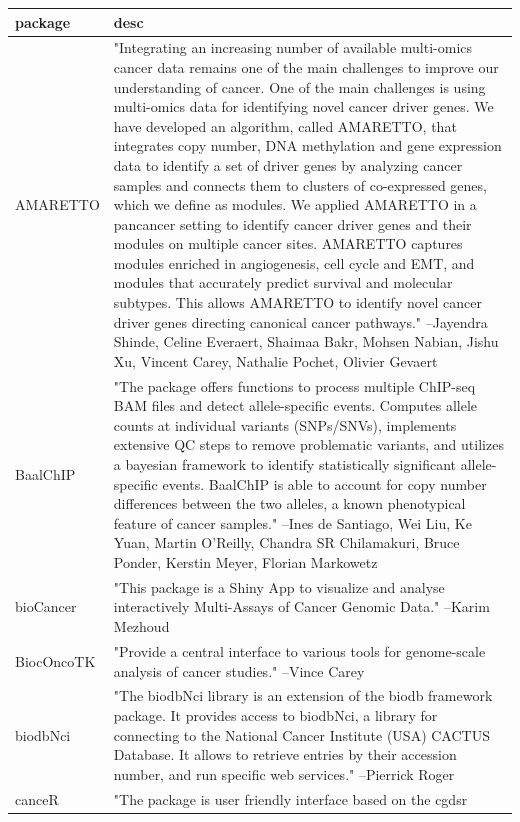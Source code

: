 \begin{longtable}[t]{l>{\raggedright\arraybackslash}p{25em}}
\toprule
package & desc\\
\midrule
AMARETTO & "Integrating an increasing number of available multi-omics
cancer data remains one of the main challenges to improve our
understanding of cancer. One of the main challenges is using
multi-omics data for identifying novel cancer driver genes. We
have developed an algorithm, called AMARETTO, that integrates
copy number, DNA methylation and gene expression data to
identify a set of driver genes by analyzing cancer samples and
connects them to clusters of co-expressed genes, which we
define as modules. We applied AMARETTO in a pancancer setting
to identify cancer driver genes and their modules on multiple
cancer sites. AMARETTO captures modules enriched in
angiogenesis, cell cycle and EMT, and modules that accurately
predict survival and molecular subtypes. This allows AMARETTO
to identify novel cancer driver genes directing canonical
cancer pathways." --Jayendra Shinde, Celine Everaert, Shaimaa Bakr, Mohsen Nabian, Jishu Xu, Vincent Carey, Nathalie Pochet, Olivier Gevaert\\
BaalChIP & "The package offers functions to process multiple ChIP-seq
BAM files and detect allele-specific events. Computes allele
counts at individual variants (SNPs/SNVs), implements extensive
QC steps to remove problematic variants, and utilizes a
bayesian framework to identify statistically significant
allele- specific events. BaalChIP is able to account for copy
number differences between the two alleles, a known
phenotypical feature of cancer samples." --Ines de Santiago, Wei Liu, Ke Yuan, Martin O'Reilly, Chandra SR Chilamakuri, Bruce Ponder, Kerstin Meyer, Florian Markowetz\\
bioCancer & "This package is a Shiny App to visualize and analyse
interactively Multi-Assays of Cancer Genomic Data." --Karim Mezhoud\\
BiocOncoTK & "Provide a central interface to various tools for
genome-scale analysis of cancer studies." --Vince Carey\\
biodbNci & "The biodbNci library is an extension of the biodb
framework package. It provides access to biodbNci, a library
for connecting to the National Cancer Institute (USA) CACTUS
Database. It allows to retrieve entries by their accession
number, and run specific web services." --Pierrick Roger\\
\addlinespace
canceR & "The package is user friendly interface based on the cgdsr

\end{longtable}
